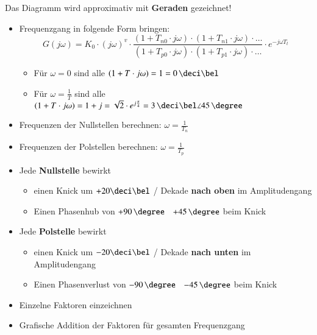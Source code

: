 Das Diagramm wird approximativ mit \textbf{Geraden} gezeichnet!

\begin{itemize}
    \item Frequenzgang in folgende Form bringen:
        $$ G(j \omega) = K_0 \cdot (j \omega)^v \cdot \frac{(1 + T_{n0} \cdot j \omega)\cdot (1 + T_{n1} \cdot j \omega) \cdot \ldots}
        {(1 + T_{p0} \cdot j \omega)\cdot (1 + T_{p1} \cdot j \omega) \cdot \ldots} \cdot e^{- j \omega T_t} $$
    \begin{itemize}
        \item Für $\omega = 0$ sind alle $(1 + T \cdot j \omega) = 1 = 0 \, \deci \bel$
        \item Für $\omega = \frac{1}{T}$ sind alle  $(1 + T \cdot j \omega) = 1 + j = \sqrt{2} \cdot e^{j \frac{\pi}{4}} 
            = 3 \, \deci \bel \angle 45 \, \degree$
    \end{itemize}
    \item Frequenzen der Nullstellen berechnen: $\omega = \frac{1}{T_n}$
    \item Frequenzen der Polstellen berechnen: $\omega = \frac{1}{T_p}$


    \item Jede \textbf{Nullstelle} bewirkt
    \begin{itemize}
        \item einen Knick um $+ 20 \deci \bel$ / Dekade \textbf{nach oben} im Amplitudengang
        \item Einen Phasenhub von $+ 90 \, \degree$ \textrightarrow\ $+ 45 \, \degree$ beim Knick
    \end{itemize}
    \item Jede \textbf{Polstelle} bewirkt
    \begin{itemize}
        \item einen Knick um $- 20 \deci \bel$ / Dekade \textbf{nach unten} im Amplitudengang
        \item Einen Phasenverlust von $- 90 \, \degree$ \textrightarrow\ $- 45 \, \degree$ beim Knick
    \end{itemize}
    \item Einzelne Faktoren einzeichnen
    \item Grafische Addition der Faktoren für gesamten Frequenzgang
\end{itemize}




